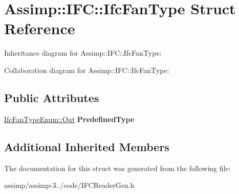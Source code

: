 \hypertarget{struct_assimp_1_1_i_f_c_1_1_ifc_fan_type}{\section{Assimp\+:\+:I\+F\+C\+:\+:Ifc\+Fan\+Type Struct Reference}
\label{struct_assimp_1_1_i_f_c_1_1_ifc_fan_type}
}


Inheritance diagram for Assimp\+:\+:I\+F\+C\+:\+:Ifc\+Fan\+Type\+:


Collaboration diagram for Assimp\+:\+:I\+F\+C\+:\+:Ifc\+Fan\+Type\+:
\subsection*{Public Attributes}
\begin{DoxyCompactItemize}
\item 
\hypertarget{struct_assimp_1_1_i_f_c_1_1_ifc_fan_type_a8a93a032c331c987d946dc0087b16cee}{\hyperlink{classboost_1_1shared__ptr}{Ifc\+Fan\+Type\+Enum\+::\+Out} {\bfseries Predefined\+Type}}\label{struct_assimp_1_1_i_f_c_1_1_ifc_fan_type_a8a93a032c331c987d946dc0087b16cee}

\end{DoxyCompactItemize}
\subsection*{Additional Inherited Members}


The documentation for this struct was generated from the following file\+:\begin{DoxyCompactItemize}
\item 
assimp/assimp-\/3../code/I\+F\+C\+Reader\+Gen.\+h\end{DoxyCompactItemize}
